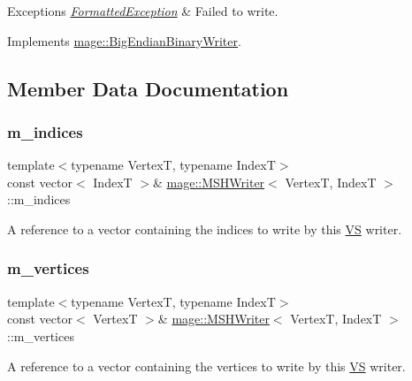 \begin{DoxyExceptions}{Exceptions}
{\em \hyperlink{structmage_1_1_formatted_exception}{Formatted\+Exception}} & Failed to write. \\
\hline
\end{DoxyExceptions}


Implements \hyperlink{classmage_1_1_big_endian_binary_writer_ae6ee6613e629971502324cffc944795d}{mage\+::\+Big\+Endian\+Binary\+Writer}.



\subsection{Member Data Documentation}
\hypertarget{classmage_1_1_m_s_h_writer_a01cf9e635af683a1a9d6fa347b219dee}{}\label{classmage_1_1_m_s_h_writer_a01cf9e635af683a1a9d6fa347b219dee} 
\subsubsection{\texorpdfstring{m\+\_\+indices}{m\_indices}}
{\footnotesize\ttfamily template$<$typename VertexT, typename IndexT$>$ \\
const vector$<$ IndexT $>$\& \hyperlink{classmage_1_1_m_s_h_writer}{mage\+::\+M\+S\+H\+Writer}$<$ VertexT, IndexT $>$\+::m\+\_\+indices\hspace{0.3cm}{\ttfamily [private]}}

A reference to a vector containing the indices to write by this \hyperlink{structmage_1_1_v_s}{VS} writer. \hypertarget{classmage_1_1_m_s_h_writer_ac0fc94011fd8200a83082201eee5ded5}{}\label{classmage_1_1_m_s_h_writer_ac0fc94011fd8200a83082201eee5ded5} 
\subsubsection{\texorpdfstring{m\+\_\+vertices}{m\_vertices}}
{\footnotesize\ttfamily template$<$typename VertexT, typename IndexT$>$ \\
const vector$<$ VertexT $>$\& \hyperlink{classmage_1_1_m_s_h_writer}{mage\+::\+M\+S\+H\+Writer}$<$ VertexT, IndexT $>$\+::m\+\_\+vertices\hspace{0.3cm}{\ttfamily [private]}}

A reference to a vector containing the vertices to write by this \hyperlink{structmage_1_1_v_s}{VS} writer. 